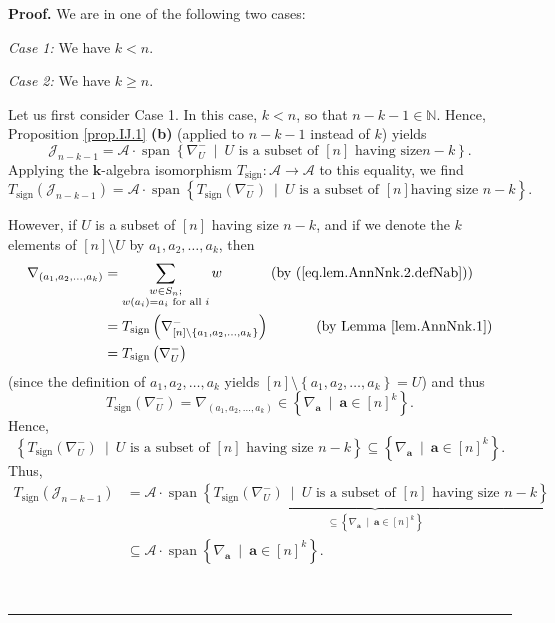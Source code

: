 \documentclass[numbers=enddot,12pt,final,onecolumn,notitlepage]{scrartcl}%
\numberwithin{exer}{subsection}
\theoremstyle{definition}
\newenvironment{proof}[1][Proof]{\noindent\textbf{#1.} }{\ \rule{0.5em}{0.5em}}
\let\sumnonlimits\sum
\renewcommand{\sum}{\sumnonlimits\limits}
\begin{document}
\begin{proof}
We are in one of the following two cases:

\textit{Case 1:} We have $k<n$.

\textit{Case 2:} We have $k\geq n$.

Let us first consider Case 1. In this case, $k<n$, so that $n-k-1\in
\mathbb{N}$. Hence, Proposition \ref{prop.IJ.1} \textbf{(b)} (applied to
$n-k-1$ instead of $k$) yields%
\[
\mathcal{J}_{n-k-1}=\mathcal{A}\cdot\operatorname*{span}\left\{  \nabla
_{U}^{-}\ \mid\ U\text{ is a subset of }\left[  n\right]  \text{ having size
}n-k\right\}  .
\]
Applying the $\mathbf{k}$-algebra isomorphism $T_{\operatorname*{sign}%
}:\mathcal{A}\rightarrow\mathcal{A}$ to this equality, we find%
\[
T_{\operatorname*{sign}}\left(  \mathcal{J}_{n-k-1}\right)  =\mathcal{A}%
\cdot\operatorname*{span}\left\{  T_{\operatorname*{sign}}\left(  \nabla
_{U}^{-}\right)  \ \mid\ U\text{ is a subset of }\left[  n\right]  \text{
having size }n-k\right\}  .
\]


However, if $U$ is a subset of $\left[  n\right]  $ having size $n-k$, and if
we denote the $k$ elements of $\left[  n\right]  \setminus U$ by $a_{1}%
,a_{2},\ldots,a_{k}$, then%
\begin{align*}
\nabla_{\left(  a_{1},a_{2},\ldots,a_{k}\right)  }  &  =\sum_{\substack{w\in
S_{n};\\w\left(  a_{i}\right)  =a_{i}\text{ for all }i}%
}w\ \ \ \ \ \ \ \ \ \ \left(  \text{by (\ref{eq.lem.AnnNnk.2.defNab})}\right)
\\
&  =T_{\operatorname*{sign}}\left(  \nabla_{\left[  n\right]  \setminus
\left\{  a_{1},a_{2},\ldots,a_{k}\right\}  }^{-}\right)
\ \ \ \ \ \ \ \ \ \ \left(  \text{by Lemma \ref{lem.AnnNnk.1}}\right) \\
&  =T_{\operatorname*{sign}}\left(  \nabla_{U}^{-}\right)
\end{align*}
(since the definition of $a_{1},a_{2},\ldots,a_{k}$ yields $\left[  n\right]
\setminus\left\{  a_{1},a_{2},\ldots,a_{k}\right\}  =U$) and thus%
\[
T_{\operatorname*{sign}}\left(  \nabla_{U}^{-}\right)  =\nabla_{\left(
a_{1},a_{2},\ldots,a_{k}\right)  }\in\left\{  \nabla_{\mathbf{a}}%
\ \mid\ \mathbf{a}\in\left[  n\right]  ^{k}\right\}  .
\]
Hence,%
\[
\left\{  T_{\operatorname*{sign}}\left(  \nabla_{U}^{-}\right)  \ \mid
\ U\text{ is a subset of }\left[  n\right]  \text{ having size }n-k\right\}
\subseteq\left\{  \nabla_{\mathbf{a}}\ \mid\ \mathbf{a}\in\left[  n\right]
^{k}\right\}  .
\]
Thus,%
\begin{align}
T_{\operatorname*{sign}}\left(  \mathcal{J}_{n-k-1}\right)   &  =\mathcal{A}%
\cdot\operatorname*{span}\underbrace{\left\{  T_{\operatorname*{sign}}\left(
\nabla_{U}^{-}\right)  \ \mid\ U\text{ is a subset of }\left[  n\right]
\text{ having size }n-k\right\}  }_{\subseteq\left\{  \nabla_{\mathbf{a}%
}\ \mid\ \mathbf{a}\in\left[  n\right]  ^{k}\right\}  }\nonumber\\
&  \subseteq\mathcal{A}\cdot\operatorname*{span}\left\{  \nabla_{\mathbf{a}%
}\ \mid\ \mathbf{a}\in\left[  n\right]  ^{k}\right\}  .
\label{pf.lem.AnnNnk.2.c1.l}%
\end{align}



\end{proof}
\end{document}
